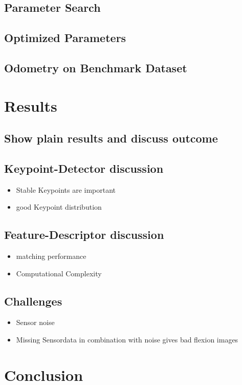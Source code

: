 \subsection{Parameter Search}
\subsection{Optimized Parameters}

\subsection{Odometry on Benchmark Dataset}

\section{Results}
\subsection{Show plain results and discuss outcome}
\subsection{Keypoint-Detector discussion}
\begin{itemize}
    \item Stable Keypoints are important
    \item good Keypoint distribution
\end{itemize}
\subsection{Feature-Descriptor discussion}
\begin{itemize}
    \item matching performance
    \item Computational Complexity
\end{itemize}

\subsection{Challenges}
\begin{itemize}
    \item Sensor noise
    \item Missing Sensordata in combination with noise gives bad flexion images
\end{itemize}

\section{Conclusion}

